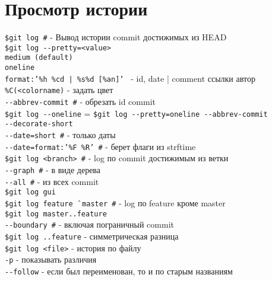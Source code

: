 \documentclass[12pt, a4paper]{article}
\begin{document}
\section{Просмотр истории}

\noindent \texttt{\$git log \indent\#} - Вывод истории commit достижимых из HEAD \\
\noindent \texttt{\$git log {-}-pretty=<value>} \\
\indent \texttt{medium (default)} \\
\indent\texttt{oneline} \\
\indent\texttt{format:'\%h \%cd | \%s\%d [\%an]' }  - id, date | comment ссылки автор \\
\indent\indent\texttt{\%C(<colorname)\indent} - задать цвет \\


	\indent \texttt{{-}-abbrev-commit \indent\#} - обрезать id commit \\
\noindent \texttt{\$git log {-}-oneline}  = \texttt{\$git log {-}-pretty=oneline {-}-abbrev-commit} \\
\indent \texttt{{-}-decorate-short} \\
\indent \texttt{{-}-date=short \indent\#} - только даты \\
\indent \texttt{{-}-date=format:'\%F \%R' \indent\#}  - берет флаги из strftime \\

\noindent \texttt{\$git log <branch> \indent\#}  - log по commit достижимым из ветки \\
\indent \texttt{{-}-graph \indent\#} - в виде дерева \\
\indent \texttt{{-}-all \indent\#} - из всех commit \\

\noindent \texttt{\$git log gui} \\
\noindent \texttt{\$git log feature {$ \mathbin{\char`\^} $}master \indent\#} - log по feature кроме master \\
\noindent \texttt{\$git log master..feature} \\
\indent \texttt{{-}-boundary \indent\#} - включая пограничный commit \\


\noindent \texttt{\$git log ..feature} - симметрическая разница \\

\noindent \texttt{\$git log <file>} - история по файлу \\
\indent \texttt{-p} - показывать различия \\
\indent \texttt{{-}-follow} - если был переименован, то и по старым названиям \\
\end{document}
